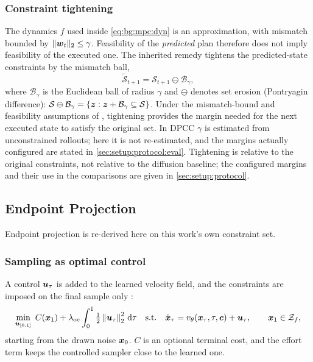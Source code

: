 \subsubsection*{Constraint tightening}

The dynamics $f$ used inside \eqref{eq:bg:mpc:dyn} is an approximation, with mismatch bounded
by $\|\boldsymbol{w}_{t}\|_{2}\le\gamma$. Feasibility of the \emph{predicted} plan therefore does not
imply feasibility of the executed one. The inherited remedy tightens the predicted-state
constraints by the mismatch ball,
\begin{equation}\label{eq:method:dpcc:tighten}
  \tilde{\mathcal{S}}_{t+1} = \mathcal{S}_{t+1}\ominus\mathcal{B}_{\gamma},
\end{equation}
where $\mathcal{B}_{\gamma}$ is the Euclidean ball of radius $\gamma$ and $\ominus$ denotes
set erosion (Pontryagin difference):
$\mathcal{S}\ominus\mathcal{B}_{\gamma}
=\{\boldsymbol{z}:\boldsymbol{z}+\mathcal{B}_{\gamma}\subseteq\mathcal{S}\}$.
Under the mismatch-bound and feasibility assumptions of
\parencite[Theorem~2]{romer2025diffusion}, tightening provides the margin needed for the next
executed state to satisfy the original set. In \ac{DPCC} $\gamma$ is estimated from unconstrained rollouts; here it is not re-estimated, and the margins
actually configured are stated in \autoref{sec:setup:protocol:eval}.
Tightening is relative to the original constraints, not relative to the diffusion baseline; the
configured margins and their use in the comparisons are given in \autoref{sec:setup:protocol}.

\subsection{Endpoint Projection}\label{sec:method:hardflow}

Endpoint projection \parencite{li2025hardflow} is re-derived here on this work's own constraint set.

\subsubsection*{Sampling as optimal control}

A control $\boldsymbol{u}_{\tau}$ is added to the learned velocity field, and the constraints are imposed on
the final sample only \parencite[Problem~1]{li2025hardflow}:
\begin{equation}\label{eq:method:hf:oc}
  \min_{\boldsymbol{u}_{[0,1]}}\; C(\boldsymbol{x}_{1})
    + \lambda_{\textrm{oc}}\int_{0}^{1}\tfrac{1}{2}\left\|\boldsymbol{u}_{\tau}\right\|_{2}^{2}\,\mathrm{d}\tau
  \quad\text{s.t.}\quad
  \dot{\boldsymbol{x}}_{\tau} = v_{\theta}(\boldsymbol{x}_{\tau},\tau,\boldsymbol{c}) + \boldsymbol{u}_{\tau},
  \qquad \boldsymbol{x}_{1}\in\mathcal{Z}_{f},
\end{equation}
starting from the drawn noise $\boldsymbol{x}_{0}$. $C$ is an optional terminal cost, and the effort term keeps
the controlled sampler close to the learned one.

